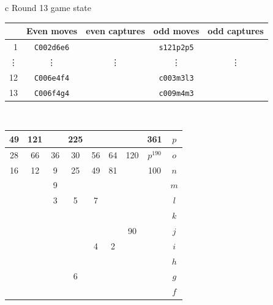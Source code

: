 \documentclass[12pt]{article}
\begin{document}
{\small{
\begin{tabular}{c}
Round 13 game state \\
\begin{tabular}{r|cc|cc}
 & Even moves & even captures    & odd moves & odd captures \\    \hline 
1   &  {\tt C002d6e6} & \quad &  {\tt s121p2p5} & \quad \\
\vdots &  \vdots    & \vdots  & \vdots    & \vdots \\  
12  &  {\tt C006e4f4} & \quad &  {\tt c003m3l3} & \quad \\
13  &  {\tt C006f4g4} & \quad &  {\tt c009m4m3} & \quad \\
\end{tabular}
\\
\begin{tabular}{|c|c|c|c|c|c|c|c||c} \hline
\squadfill{\,}49 & \squadfill{\,}121 & \quad & \squadfill{\,}225 & \quad & \quad & \quad & \squadfill{\,}361 & $p$ \\ \hline
\squadfill{\,}28 & \squadfill{\,}66 & \trianglepafill{\,}36 & \trianglepafill{\,}30 & \trianglepafill{\,}56 & \trianglepafill{\,}64 & \squadfill{\,}120 & \rhombusfill{\,}$p^{190}$ & $o$ \\ \hline
\trianglepafill{\,}16 & \trianglepafill{\,}12 & \circletfill{\,}9 & \circletfill{\,}25 & \circletfill{\,}49 & \circletfill{\,}81 & \quad & \trianglepafill{\,}100 & $n$ \\ \hline
\quad & \quad & \circletfill{\,}9 & \quad & \quad & \quad & \quad & \quad & $m$ \\ \hline
\quad & \quad & \circletfill{\,}3 & \circletfill{\,}5 & \circletfill{\,}7 & \quad & \quad & \quad & $l$ \\ \hline
\quad & \quad & \quad & \quad & \quad & \quad & \quad & \quad & $k$ \\ \hline
\quad & \quad & \quad & \quad & \quad & \quad & \trianglepafill{\,}90 & \quad & $j$ \\ \hline
\quad & \quad & \quad & \quad & \circlet{\,}4 & \circlet{\,}2 & \quad & \quad & $i$ \\ \hline
\quad & \quad & \quad & \quad & \quad & \quad & \quad & \quad & $h$ \\ \hline
\quad & \quad & \quad & \circlet{\,}6 & \quad & \quad & \quad & \quad & $g$ \\ \hline
\quad & \quad & \quad & \quad & \quad & \quad & \quad & \quad & $f$ \\ \hline

\end{tabular}
\end{tabular}}}
\end{document}
